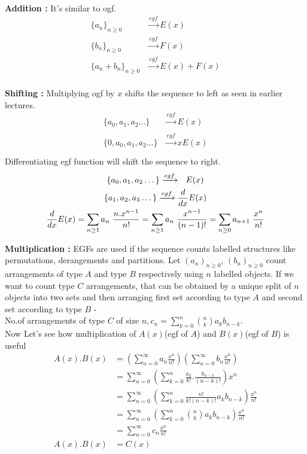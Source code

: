 \begin{parts}
\item{\textbf{Addition :} } It's similar to ogf.
    \begin{align*}
        \{a_n\}_{n \geq 0} &\xrightarrow[]{egf} E(x) \\
        \{b_n\}_{n \geq 0} &\xrightarrow[]{egf} F(x) \\
        \{a_n + b_n \}_{n \geq 0} &\xrightarrow[]{egf} E(x) + F(x) \\
    \end{align*}
\item {\textbf{Shifting :} } Multiplying ogf by $x$ shifts the sequence to left as seen in earlier lectures.  
    \begin{align*}
        \{a_0, a_1, a_2 \dots \} &\xrightarrow[]{egf} E(x) \\
        \{0, a_0, a_1, a_2 \dots \} &\xrightarrow[]{egf} xE(x) \\
    \end{align*}
Differentiating egf function will shift the sequence to right.
\begin{gather*}
    \{a_0, a_1, a_2 \dots \} \xrightarrow[]{egf} ~~ E(x) \endline
        \{a_1, a_2, a_3 \dots \} \xrightarrow[]{egf} \frac{d}{dx} E(x) \\
        \frac{d}{dx} E(x) = \sum_{n \geq 1} a_n~ \frac{n. x^{n-1}}{n!} = \sum_{n \geq 1} a_n~ \frac{x^{n-1}}{(n-1)!} =  \sum_{n \geq 0} a_{n+1}~ \frac{x^{n}}{n!}
\end{gather*}
\item {\textbf{Multiplication :} }   EGFs are used if the sequence counts labelled structures like permutations, derangements and partitions. Let $(a_n)_{n \geq 0}$, $(b_n)_{n \geq 0}$ count arrangements  of type $A$ and type $B$ respectively using $n$ labelled objects. If we want to count type $C$ arrangements, that can be obtained by a unique split of $n$ objects into two sets and then arranging first set according to type $A$ and second set according to type $B$ - \\
 No.of arrangements of type $C$ of size $n, c_n = \sum_{k=0}^n {n \choose k} a_k b_{n-k}$.\\
 Now Let's see how multiplication of $A(x)$(egf of $A$) and $B(x)$(egf of $B$) is useful 
 \begin{align*}
     A(x).B(x) &= (\sum_{n=0}^{\infty} a_n \frac{x^n}{n!})(\sum_{n=0}^{\infty} b_n \frac{x^n}{n!}) \\
     &= \sum_{n=0}^{\infty}(\sum_{k=0}^{n} \frac{a_k}{k!}.\frac{b_{n-k}}{(n-k)!}) x^n \\
     &= \sum_{n=0}^{\infty}(\sum_{k=0}^{n} \frac{n!}{k!(n-k)!} a_k b_{n-k}) \frac{x^n}{n!} \\
     &= \sum_{n=0}^{\infty}(\sum_{k=0}^{n} {n \choose k} a_k b_{n-k}) \frac{x^n}{n!} \\
     &= \sum_{n=0}^{\infty} c_n \frac{x^n}{n!} \\
     A(x).B(x) &= C(x)
 \end{align*}
 

\end{parts}
